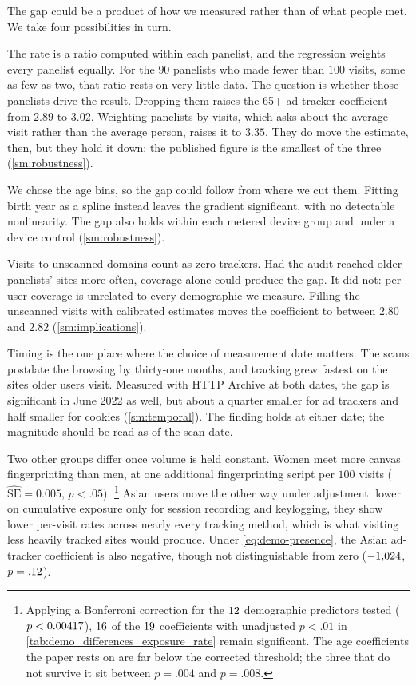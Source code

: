 \documentclass[12pt, letterpaper]{article}
\begin{document}
The gap could be a product of how we measured rather than of what people met. We take four possibilities in turn.

The rate is a ratio computed within each panelist, and the regression weights every panelist equally. For the $90$ panelists who made fewer than $100$ visits, some as few as two, that ratio rests on very little data. The question is whether those panelists drive the result. Dropping them raises the 65+ ad-tracker coefficient from $2.89$ to $3.02$. Weighting panelists by visits, which asks about the average visit rather than the average person, raises it to $3.35$. They do move the estimate, then, but they hold it down: the published figure is the smallest of the three (\cref{sm:robustness}).

We chose the age bins, so the gap could follow from where we cut them. Fitting birth year as a spline instead leaves the gradient significant, with no detectable nonlinearity. The gap also holds within each metered device group and under a device control (\cref{sm:robustness}).
 
Visits to unscanned domains count as zero trackers. Had the audit reached older panelists' sites more often, coverage alone could produce the gap.
It did not: per-user coverage is unrelated to every demographic we measure. Filling the unscanned visits with calibrated estimates moves the coefficient to between $2.80$ and $2.82$ (\cref{sm:implications}).

Timing is the one place where the choice of measurement date matters. The scans postdate the browsing by thirty-one months, and tracking grew fastest on the sites older users visit. Measured with HTTP Archive at both dates, the gap is significant in June 2022 as well, but about a quarter smaller for ad trackers and half smaller for cookies (\cref{sm:temporal}). The finding holds at either date; the magnitude should be read as of the scan date.
 
Two other groups differ once volume is held constant. Women meet more canvas fingerprinting than men, at one additional fingerprinting script per $100$ visits ($\widehat{\mathrm{SE}} = 0.005$, $p < .05$).%
\footnote{
    \label{fn:bonferroni}
    Applying a Bonferroni correction for the $12$ demographic predictors tested ($p < 0.00417$), $16$ of the $19$ coefficients with unadjusted $p < .01$ in \cref{tab:demo_differences_exposure_rate} remain significant. The age coefficients the paper rests on are far below the corrected threshold; the three that do not survive it sit between $p = .004$ and $p = .008$.
}
Asian users move the other way under adjustment: lower on cumulative exposure only for session recording and keylogging, they show lower per-visit rates across nearly every tracking method, which is what visiting less heavily tracked sites would produce.
Under \cref{eq:demo-presence}, the Asian ad-tracker coefficient is also negative, though not distinguishable from zero ($-1{,}024$, $p = .12$).
 
\end{document}
